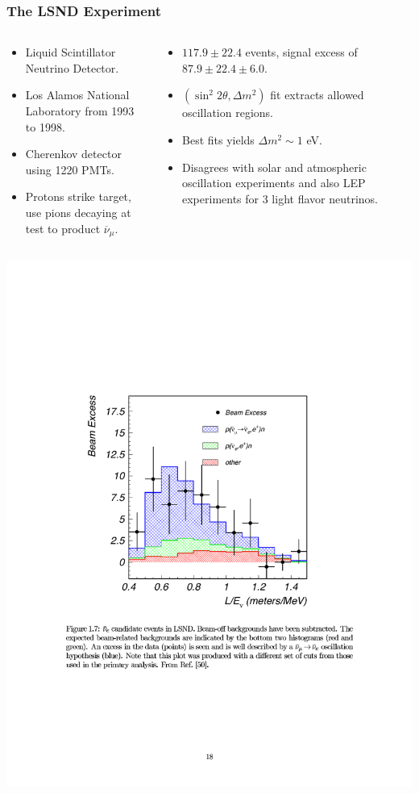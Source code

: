 \documentclass[mathserif,18pt,xcolor=table]{beamer}
\begin{document}
\begin{frame}
  \frametitle{The LSND Experiment}
  \footnotesize{
    \begin{columns}
      \begin{column}{.5\linewidth}      
        \begin{itemize}
        \item Liquid Scintillator Neutrino Detector.
        \item Los Alamos National Laboratory from 1993 to 1998.
        \item Cherenkov detector using 1220 PMTs.
        \item Protons strike target, use pions decaying at test to product $\overline{\nu}_\mu$.
        \end{itemize}
      \end{column}
      \begin{column}{.5\linewidth}
        \begin{itemize}
        \item $117.9 \pm 22.4$ events, signal excess of $87.9\pm 22.4 \pm 6.0$.
        \item $(\sin^2 2\theta,\Delta m^2)$ fit extracts allowed oscillation regions.
        \item Best fits yields $\Delta m^2 \sim 1$ eV.
        \item Disagrees with solar and atmospheric oscillation experiments and also LEP experiments for 3 light flavor neutrinos.
        \end{itemize}
      \end{column}
    \end{columns}
  }
  \begin{center}
    \includegraphics[width=.35\linewidth]{../figures/LSND_plot.pdf}
  \end{center}
\end{frame}
\end{document}
